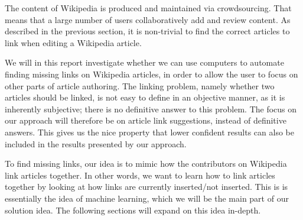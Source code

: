 The content of Wikipedia is produced and maintained via crowdsourcing. That means that a large number of users collaboratively add and review content. As described in the previous section, it is non-trivial to find the correct articles to link when editing a Wikipedia article.

We will in this report investigate whether we can use computers to automate finding missing links on Wikipedia articles, in order to allow the user to focus on other parts of article authoring. The linking problem, namely whether two articles should be linked, is not easy to define in an objective manner, as it is inherently subjective; there is no definitive answer to this problem. The focus on our approach will therefore be on article link suggestions, instead of definitive answers. This gives us the nice property that lower confident results can also be included in the results presented by our approach.

To find missing links, our idea is to mimic how the contributors on Wikipedia link articles together. In other words, we want to learn how to link articles together by looking at how links are currently inserted/not inserted. This is is essentially the idea of machine learning, which we will be the main part of our solution idea. The following sections will expand on this idea in-depth.